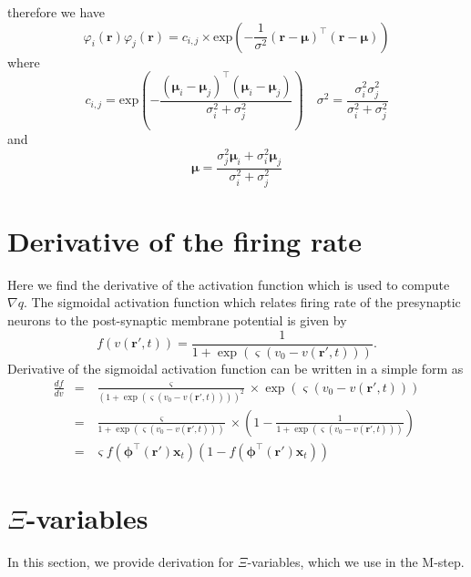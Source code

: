\documentclass[]{article}
\begin{document}
therefore we have
\begin{equation}
 \varphi_i(\mathbf r)\varphi_j(\mathbf r)=c_{i,j}\times\mathrm{exp}\left({-\frac{1}{\sigma^2} (\mathbf r-\boldsymbol \mu)^\top(\mathbf r-\boldsymbol\mu)}\right)
\end{equation}
where
\begin{equation}
 c_{i,j}=\mathrm{exp}\left(-\frac{(\boldsymbol \mu_i-\boldsymbol\mu_j)^\top(\boldsymbol \mu_i-\boldsymbol\mu_j)}{\sigma_i^2+\sigma_j^2}\right) \quad \sigma^2=\frac{\sigma_i^2\sigma_j^2}{\sigma_i^2+\sigma_j^2}
\end{equation}
and
\begin{equation}
 \boldsymbol\mu=\frac{\sigma_j^2\boldsymbol\mu_i+\sigma_i^2\boldsymbol\mu_j}{\sigma_i^2+\sigma_j^2}
\end{equation}
\section*{Derivative of the firing rate}\label{sec:FiringrateDerivative} 
Here we find the derivative of the activation function which is used to compute  $\nabla q$. The sigmoidal activation function which relates firing rate of the presynaptic neurons to the post-synaptic membrane potential is given by
\begin{equation}
	\label{ActivationFunction} f\left( v\left( \mathbf{r}', t \right) \right) = \frac{1}{1 + \exp \left( \varsigma \left( v_0 - v\left(\mathbf{r}',t\right) \right) \right)}. 
\end{equation}
Derivative of the sigmoidal activation function can be written in a simple form as
\begin{eqnarray}
 \frac{df}{dv}&=& \frac{\varsigma}{\left(1 + \exp \left( \varsigma \left( v_0 - v\left(\mathbf{r}',t\right) \right) \right)\right)^2} \times \exp \left( \varsigma \left( v_0 - v\left(\mathbf{r}',t\right) \right) \right) \nonumber \\
&=&\frac{\varsigma}{1 + \exp \left( \varsigma \left( v_0 - v\left(\mathbf{r}',t\right) \right) \right)} \times \left(1-\frac{1}{1 + \exp \left( \varsigma \left( v_0 - v\left(\mathbf{r}',t\right) \right) \right)}\right) \nonumber \\
&=& \varsigma f(\boldsymbol \phi^\top(\mathbf r')\mathbf {x}_t)\left( 1-f( \boldsymbol \phi^\top(\mathbf r')\mathbf {x}_t)\right)
\end{eqnarray}
\section*{$\Xi$-variables}\label{sec:Xivariables} 
In this section, we provide derivation for $\Xi$-variables, which we use in the M-step. 
\end{document}
